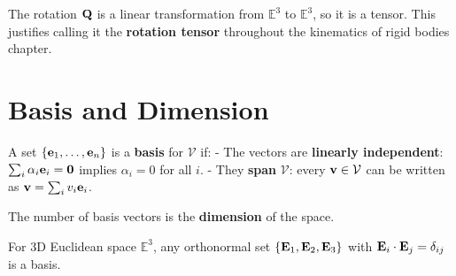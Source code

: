 \documentclass[
  letterpaper,
  DIV=11,
  numbers=noendperiod]{scrreprt}
\begin{document}
\begin{tcolorbox}[enhanced jigsaw, arc=.35mm, bottomrule=.15mm, bottomtitle=1mm, breakable, colback=white, colbacktitle=quarto-callout-important-color!10!white, colframe=quarto-callout-important-color-frame, coltitle=black, left=2mm, leftrule=.75mm, opacityback=0, opacitybacktitle=0.6, rightrule=.15mm, title=\textcolor{quarto-callout-important-color}{\faExclamation}\hspace{0.5em}{Note!}, titlerule=0mm, toprule=.15mm, toptitle=1mm]

The rotation \({\bf Q}\) is a linear transformation from
\(\mathbb{E}^3\) to \(\mathbb{E}^3\), so it is a tensor. This justifies
calling it the \textbf{rotation tensor} throughout the kinematics of
rigid bodies chapter.

\end{tcolorbox}

\section{Basis and Dimension}\label{basis-and-dimension}

A set \(\{{\bf e}_1,\ldots,{\bf e}_n\}\) is a \textbf{basis} for
\(\mathcal{V}\) if: - The vectors are \textbf{linearly independent}:
\(\sum_i \alpha_i{\bf e}_i = {\bf 0}\) implies \(\alpha_i = 0\) for all
\(i\). - They \textbf{span} \(\mathcal{V}\): every
\({\bf v} \in \mathcal{V}\) can be written as
\({\bf v} = \sum_i v_i{\bf e}_i\).

The number of basis vectors is the \textbf{dimension} of the space.

For 3D Euclidean space \(\mathbb{E}^3\), any orthonormal set
\(\{{\bf E}_1,{\bf E}_2,{\bf E}_3\}\) with
\({\bf E}_i\cdot{\bf E}_j = \delta_{ij}\) is a basis.
\end{document}
